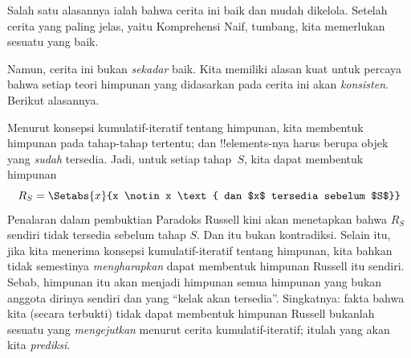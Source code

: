 \documentclass[../../../include/open-logic-section]{subfiles}
\begin{document}
Salah satu alasannya ialah bahwa cerita ini baik dan mudah dikelola. Setelah
cerita yang paling jelas, yaitu Komprehensi Naif, tumbang, kita memerlukan
sesuatu yang baik.

Namun, cerita ini bukan \emph{sekadar} baik. Kita memiliki alasan kuat untuk
percaya bahwa setiap teori himpunan yang didasarkan pada cerita ini akan
\emph{konsisten}. Berikut alasannya.

Menurut konsepsi kumulatif-iteratif tentang himpunan, kita membentuk himpunan
pada tahap-tahap tertentu; dan !!{element}s-nya harus berupa objek yang
\emph{sudah} tersedia. Jadi, untuk setiap tahap~$S$, kita dapat membentuk
himpunan
\[
	R_S = \Setabs{x}{x \notin x \text{ dan $x$ tersedia sebelum $S$}}
\]
Penalaran dalam pembuktian Paradoks Russell kini akan menetapkan bahwa $R_S$
sendiri tidak tersedia sebelum tahap $S$. Dan itu bukan kontradiksi. Selain
itu, jika kita menerima konsepsi kumulatif-iteratif tentang himpunan, kita
bahkan tidak semestinya \emph{mengharapkan} dapat membentuk himpunan Russell
itu sendiri. Sebab, himpunan itu akan menjadi himpunan semua himpunan yang
bukan anggota dirinya sendiri dan yang ``kelak akan tersedia''. Singkatnya:
fakta bahwa kita (secara terbukti) tidak dapat membentuk himpunan Russell
bukanlah sesuatu yang \emph{mengejutkan} menurut cerita kumulatif-iteratif;
itulah yang akan kita \emph{prediksi}.

%

\end{document}
